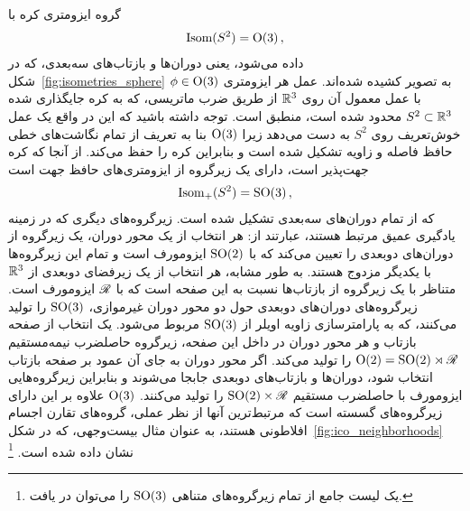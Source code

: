 گروه ایزومتری کره با
\begin{align}
    \operatorname{Isom}(S^2) = \operatorname{O}(3) \,,
\end{align}
داده می‌شود، یعنی دوران‌ها و بازتاب‌های سه‌بعدی، که در شکل~\ref{fig:isometries_sphere} به تصویر کشیده شده‌اند.
عمل هر ایزومتری $\phi\in\operatorname{O}(3)$ با عمل معمول آن روی $\mathbb{R}^3$ از طریق ضرب ماتریسی، که به کره جایگذاری شده $S^2 \subset \mathbb{R}^3$ محدود شده است، منطبق است.
توجه داشته باشید که این در واقع یک عمل خوش‌تعریف روی $S^2$ به دست می‌دهد زیرا $\operatorname{O}(3)$ بنا به تعریف از تمام نگاشت‌های خطی حافظ فاصله و زاویه تشکیل شده است و بنابراین کره را حفظ می‌کند.
از آنجا که کره جهت‌پذیر است، دارای یک زیرگروه از ایزومتری‌های حافظ جهت است
\begin{align}
    \operatorname{Isom}_+(S^2) = \operatorname{SO}(3) \,,
\end{align}
که از تمام دوران‌های سه‌بعدی تشکیل شده است.
زیرگروه‌های دیگری که در زمینه یادگیری عمیق مرتبط هستند، عبارتند از:
هر انتخاب از یک محور دوران، یک زیرگروه از دوران‌های دوبعدی را تعیین می‌کند که با $\operatorname{SO}(2)$ ایزومورف است و تمام این زیرگروه‌ها با یکدیگر مزدوج هستند.
به طور مشابه، هر انتخاب از یک زیرفضای دوبعدی از $\mathbb{R}^3$ متناظر با یک زیرگروه از بازتاب‌ها نسبت به این صفحه است که با $\mathscr{R}$ ایزومورف است.
زیرگروه‌های دوران‌های دوبعدی حول دو محور دوران غیرموازی، $\operatorname{SO}(3)$ را تولید می‌کنند، که به پارامترسازی زاویه اویلر از $\operatorname{SO}(3)$ مربوط می‌شود.
یک انتخاب از صفحه بازتاب و هر محور دوران در داخل این صفحه، زیرگروه حاصلضرب نیمه‌مستقیم $\operatorname{O}(2) = \operatorname{SO}(2) \rtimes \mathscr{R}$ را تولید می‌کند.
اگر محور دوران به جای آن عمود بر صفحه بازتاب انتخاب شود، دوران‌ها و بازتاب‌های دوبعدی جابجا می‌شوند و بنابراین زیرگروه‌هایی ایزومورف با حاصلضرب مستقیم $\operatorname{SO}(2) \times \mathscr{R}$ را تولید می‌کنند.
$\operatorname{O}(3)$ علاوه بر این دارای زیرگروه‌های گسسته است که مرتبط‌ترین آنها از نظر عملی، گروه‌های تقارن اجسام افلاطونی هستند، به عنوان مثال بیست‌وجهی، که در شکل~\ref{fig:ico_neighborhoods} نشان داده شده است.%
\footnote{
    یک لیست جامع از تمام زیرگروه‌های متناهی $\operatorname{SO}(3)$ را می‌توان در \href{https://ncatlab.org/nlab/show/SO\%283\%29\#finite_subgroups}{} یافت.
}


